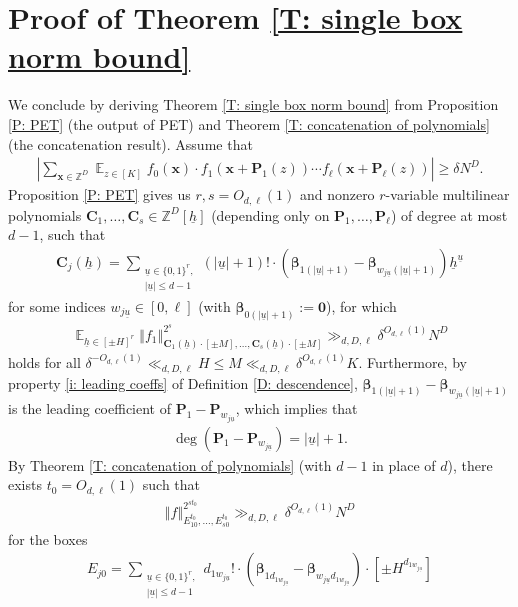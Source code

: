 \documentclass[11pt]{amsart}
\theoremstyle{definition}
\DeclareMathOperator*{\E}{\mathbb{E}}
\newcommand{\Z}{{\mathbb Z}}
\newcommand{\bc}{{\textbf{C}}}
\newcommand{\bp}{{\textbf{P}}}
\newcommand{\p}{{\textbf{P}}}
\newcommand{\bx}{{\textbf{x}}}
\newcommand{\bbeta}{{\boldsymbol{\beta}}}
\newcommand{\uh}{{\underline{h}}}
\newcommand{\uu}{{\underline{u}}}
\newcommand{\norm}[1]{\left\Vert #1\right\Vert}
\newcommand{\abs}[1]{\mathopen{}\left| #1\mathclose{}\right|}
\begin{document}
\section{Proof of Theorem \ref{T: single box norm bound}}\label{S: proof of main thm}

We conclude by deriving Theorem \ref{T: single box norm bound} from Proposition \ref{P: PET} (the output of PET) and Theorem \ref{T: concatenation of polynomials} (the concatenation result).
    Assume that 
    \begin{align*}
            \abs{\sum_{\bx\in\Z^D}\E_{z\in[K]} f_0(\bx)\cdot f_1(\bx+\p_1(z))\cdots f_\ell(\bx+\p_\ell(z))} \geq \delta N^D.
    \end{align*}
    Proposition \ref{P: PET} gives us $r, s=O_{d,\ell}(1)$ and nonzero $r$-variable multilinear polynomials $\bc_1, \ldots, \bc_s\in\Z^D[\uh]$ (depending only on $\bp_1, \ldots, \bp_\ell$) of degree at most $d-1$, such that 
    \begin{align*}
        \bc_{j}(\uh) = \sum_{\substack{\uu\in \{0,1\}^{r},\\ |\uu|\leq d-1}}     (|\uu|+1)! \cdot (\bbeta_{1(|\uu|+1)}-\bbeta_{w_{j\uu}(|\uu|+1)})\uh^\uu
    \end{align*}
                for some indices $w_{j\uu}\in[0,\ell]$ (with $\bbeta_{0(|\uu|+1)}:=\mathbf{0}$), for which
      \begin{align*}
       \E_{\uh\in[\pm H]^{r}}\norm{f_1}_{{\bc_1(\uh)}\cdot[\pm M], \ldots, {\bc_s(\uh)\cdot[\pm M]}}^{2^s} \gg_{d, D, \ell} \delta^{O_{d,\ell}(1)}N^D
   \end{align*}
   holds for all $\delta^{-O_{d,\ell}(1)}\ll_{d, D, \ell} H\leq  M\ll_{d, D, \ell}\delta^{O_{d, \ell}(1)}K$.
   Furthermore, by property \eqref{i: leading coeffs} of Definition \ref{D: descendence}, $\bbeta_{1(|\uu|+1)}-\bbeta_{w_{j\uu}(|\uu|+1)}$ is the leading coefficient of $\p_1 - \p_{w_{j\uu}}$, which implies that
  \begin{align*}%
      \deg (\bp_1 - \bp_{w_{j\uu}}) = |\uu|+1.
  \end{align*}
  By Theorem \ref{T: concatenation of polynomials} (with $d-1$ in place of $d$), there exists $t_0=O_{d,\ell}(1)$ such that %
    \begin{align*}
        \norm{f}_{E_{10}^{ t_0}, \ldots, E_{s0}^{ t_0}}^{2^{st_0}}\gg_{d, D, \ell}\delta^{O_{d, \ell}(1)}N^D
    \end{align*}
    for the boxes 
    \begin{align*}
        E_{j0} = \sum_{\substack{\uu\in \{0,1\}^{r},\\ |\uu|\leq d-1}}     d_{1w_{j\uu}}! \cdot (\bbeta_{1d_{1w_{j\uu}}}-\bbeta_{w_{j\uu}d_{1w_{j\uu}}})\cdot [\pm H^{d_{1w_{j\uu}}}]
    \end{align*}    
\end{document}
